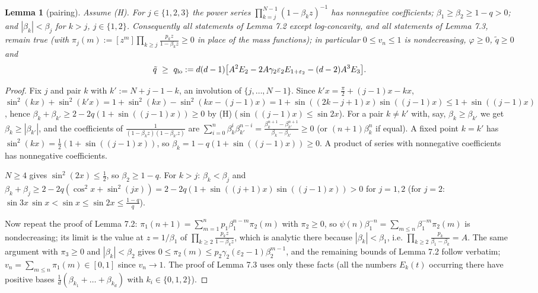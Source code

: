 \documentclass[11pt,a4paper]{article}
\newtheorem{lemma}[theorem]{Lemma}
\theoremstyle{definition}
\theoremstyle{remark}
\begin{document}
\begin{lemma}[{pairing}]
Assume (H). For $j\in\{1,2,3\}$ the power series $\prod_{k=j}^{N-1}(1-\beta_kz)^{-1}$ has nonnegative coefficients; $\beta_1\ge\beta_2\ge1-q>0$; and $|\beta_k|<\beta_j$ for $k>j$, $j\in\{1,2\}$. Consequently all statements of Lemma 7.2 except log-concavity, and all statements of Lemma 7.3, remain true (with $\pi_j(m):=[z^m]\prod_{k\ge j}\frac{p_kz}{1-\beta_kz}\ge0$ in place of the mass functions); in particular $0\le v_n\le1$ is nondecreasing, $\varphi\ge0$, $\tilde q\ge0$ and
\begin{equation*}
\tilde q\ \ge\ q_{\rm lo}:=d(d-1)\bigl[A^2E_2-2A\gamma_2\varepsilon_2E_{1+\varepsilon_2}-(d-2)A^3E_3\bigr].
\end{equation*}
\end{lemma}

\begin{proof}
Fix $j$ and pair $k$ with $k':=N+j-1-k$, an involution of $\{j,\dots,N-1\}$. Since $k'x=\frac\pi2+(j-1)x-kx$, $\sin^2(kx)+\sin^2(k'x)=1+\sin^2(kx)-\sin^2(kx-(j-1)x)=1+\sin((2k-j+1)x)\sin((j-1)x)\le1+\sin((j-1)x)$, hence $\beta_k+\beta_{k'}\ge2-2q(1+\sin((j-1)x))\ge0$ by (H) ($\sin((j-1)x)\le\sin2x$). For a pair $k\ne k'$ with, say, $\beta_k\ge\beta_{k'}$ we get $\beta_k\ge|\beta_{k'}|$, and the coefficients of $\frac{1}{(1-\beta_kz)(1-\beta_{k'}z)}$ are $\sum_{i=0}^n\beta_k^i\beta_{k'}^{n-i}=\frac{\beta_k^{n+1}-\beta_{k'}^{n+1}}{\beta_k-\beta_{k'}}\ge0$ (or $(n+1)\beta_k^n$ if equal). A fixed point $k=k'$ has $\sin^2(kx)=\frac12(1+\sin((j-1)x))$, so $\beta_k=1-q(1+\sin((j-1)x))\ge0$. A product of series with nonnegative coefficients has nonnegative coefficients.

$N\ge4$ gives $\sin^2(2x)\le\frac12$, so $\beta_2\ge1-q$. For $k>j$: $\beta_k<\beta_j$ and $\beta_k+\beta_j\ge2-2q(\cos^2x+\sin^2(jx))=2-2q(1+\sin((j+1)x)\sin((j-1)x))>0$ for $j=1,2$ (for $j=2$: $\sin3x\,\sin x<\sin x\le\sin2x\le\frac{1-q}{q}$).

Now repeat the proof of Lemma 7.2: $\pi_1(n+1)=\sum_{m=1}^np_1\beta_1^{n-m}\pi_2(m)$ with $\pi_2\ge0$, so $\psi(n)\beta_1^{-n}=\sum_{m\le n}\beta_1^{-m}\pi_2(m)$ is nondecreasing; its limit is the value at $z=1/\beta_1$ of $\prod_{k\ge2}\frac{p_kz}{1-\beta_kz}$, which is analytic there because $|\beta_k|<\beta_1$, i.e. $\prod_{k\ge2}\frac{p_k}{\beta_1-\beta_k}=A$. The same argument with $\pi_3\ge0$ and $|\beta_k|<\beta_2$ gives $0\le\pi_2(m)\le p_2\gamma_2(\varepsilon_2-1)\beta_2^{m-1}$, and the remaining bounds of Lemma 7.2 follow verbatim; $v_n=\sum_{m\le n}\pi_1(m)\in[0,1]$ since $v_n\to1$. The proof of Lemma 7.3 uses only these facts (all the numbers $E_k(t)$ occurring there have positive bases $\frac1d(\beta_{k_1}+\dots+\beta_{k_d})$ with $k_i\in\{0,1,2\}$).


\end{proof}
\end{document}
